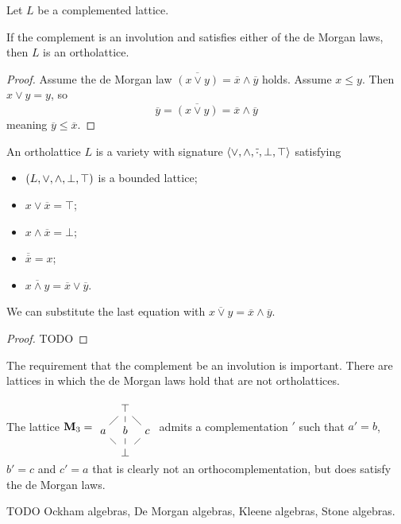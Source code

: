 \begin{proposition}
Let $L$ be a complemented lattice.

If the complement is an involution and satisfies either of the de Morgan laws, then $L$ is an ortholattice.
\end{proposition}
\begin{proof}
Assume the de Morgan law $\overline{(x\vee y)} = \overline{x} \wedge \overline{y}$ holds. Assume $x\leq y$. Then $x\vee y = y$, so
\[ \overline{y} = \overline{(x\vee y)} = \overline{x} \wedge \overline{y} \]
meaning $\overline{y} \leq \overline{x}$.
\end{proof}
\begin{corollary}
An ortholattice $L$ is a variety with signature $\left\langle \vee, \wedge, \overline{\cdot}, \bot,\top \right\rangle$ satisfying
\begin{itemize}
\item $\sSet{L, \vee, \wedge, \bot, \top}$ is a bounded lattice;
\item $x\vee\overline{x} = \top$;
\item $x\wedge\overline{x} = \bot$;
\item $\overline{\overline{x}} = x$;
\item $\overline{x\wedge y} = \overline{x}\vee \overline{y}$.
\end{itemize}
\end{corollary}
We can substitute the last equation with $\overline{x\vee y} = \overline{x}\wedge \overline{y}$.
\begin{proof}
TODO
\end{proof}

The requirement that the complement be an involution is important. There are lattices in which the de Morgan laws hold that are not ortholattices.

\begin{example}
The lattice $\mathbf{M}_3 = \begin{tikzcd}[column sep={2em,between origins},row sep={2em,between origins}]
&\top \ar[ld, dash] \ar[d,dash] \ar[rd, dash] &\\ a \ar[rd, dash]& b \ar[d, dash] & c \ar[ld, dash] \\ &\bot &
\end{tikzcd}$ admits a complementation $'$ such that $a' = b$, $b' = c$ and $c' = a$ that is clearly not an orthocomplementation, but does satisfy the de Morgan laws.
\end{example}

TODO Ockham algebras, De Morgan algebras, Kleene algebras, Stone algebras.

